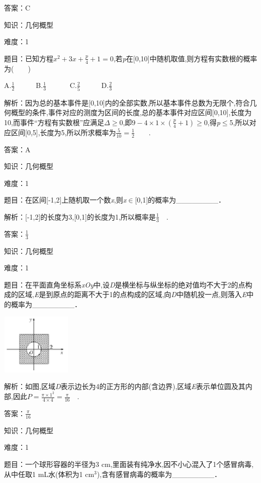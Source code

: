 \documentclass{article} %
\begin{document}
答案：C

知识：几何概型

难度：1

题目：已知方程$x^2+3x+\frac{p}{4}+1=0$,若\textit{p}在[0,10]中随机取值,则方程有实数根的概率为(　　)

A.$\frac{1}{2}$　　　B.$\frac{1}{3}$　　　
C.$\frac{2}{5}$　　　D.$\frac{2}{3}$　　

解析：因为总的基本事件是[0,10]内的全部实数,所以基本事件总数为无限个,符合几何概型的条件,事件对应的测度为区间的长度,总的基本事件对应区间[0,10],长度为10,而事件``方程有实数根''应满足\textit{$\mathit{\Delta}$}$\mathrm{\ge}$0,即$9-4\times1\times(\frac{p}{4}+1) \ge0$,得\textit{p}$\mathrm{\le}$5,所以对应区间[0,5],长度为5,所以所求概率为$\frac{5}{10}=\frac{1}{2}$　　.

答案：A

知识：几何概型

难度：1

题目：在区间[-1,2]上随机取一个数\textit{x},则\textit{x}$\mathrm{\in}$[0,1]的概率为\_\_\_\_\_\_\_\_．

解析：[-1,2]的长度为3,[0,1]的长度为1,所以概率是$\frac{1}{3}$　.

答案：$\frac{1}{3}$　

知识：几何概型

难度：1

题目：在平面直角坐标系\textit{xOy}中,设\textit{D}是横坐标与纵坐标的绝对值均不大于2的点构成的区域,\textit{E}是到原点的距离不大于1的点构成的区域,向\textit{D}中随机投一点,则落入\textit{E}中的概率为\_\_\_\_\_\_\_\_．

\includegraphics*[width=1.34in, height=1.16in, keepaspectratio=false]{image106}

解析：如图,区域\textit{D}表示边长为4的正方形的内部(含边界),区域\textit{E}表示单位圆及其内部,因此$P=\frac{\pi\times1^2}{4\times4}=\frac{\pi}{16}$　.

答案：$\frac{\pi}{16}$　

知识：几何概型

难度：1

题目：一个球形容器的半径为3 cm,里面装有纯净水,因不小心混入了1个感冒病毒,从中任取1 mL水(体积为1 cm${}^{3}$),含有感冒病毒的概率为\_\_\_\_\_\_\_\_．
\end{document}
